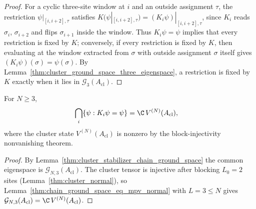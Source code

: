 \begin{proof}
    \leanok
    For a cyclic three-site window at $i$ and an outside assignment $\tau$,
    the restriction $\psi|_{[i,i+2],\tau}$ satisfies
    $K\bigl(\psi|_{[i,i+2],\tau}\bigr) = (K_i\psi)|_{[i,i+2],\tau}$, since
    $K_i$ reads $\sigma_i$, $\sigma_{i+2}$ and flips $\sigma_{i+1}$ inside the
    window. Thus $K_i\psi = \psi$ implies that every restriction is fixed by
    $K$; conversely, if every restriction is fixed by $K$, then evaluating at
    the window extracted from $\sigma$ with outside assignment $\sigma$ itself
    gives $(K_i\psi)(\sigma) = \psi(\sigma)$. By
    Lemma~\ref{thm:cluster_ground_space_three_eigenspace}, a restriction is
    fixed by $K$ exactly when it lies in $\mathcal G_3(A_{\mathrm{cl}})$.
\end{proof}

\begin{lemma}
    \label{thm:cluster_stabilizer_unique_gs}
    \leanok
    For $N\ge3$,
    \begin{align}
        \bigcap_i\{\psi : K_i\psi = \psi\}
         & = \C\,V^{(N)}(A_{\mathrm{cl}}),
        \notag
    \end{align}
    where the cluster state $V^{(N)}(A_{\mathrm{cl}})$ is nonzero by the
    block-injectivity nonvanishing theorem.
\end{lemma}

\begin{proof}
    \leanok
    By Lemma~\ref{thm:cluster_stabilizer_chain_ground_space} the common
    eigenspace is $\mathcal G_{N,3}(A_{\mathrm{cl}})$. The cluster tensor is
    injective after blocking $L_0 = 2$ sites
    (Lemma~\ref{thm:cluster_normal}), so
    Lemma~\ref{thm:chain_ground_space_eq_mpv_normal} with $L = 3 \le N$
    gives $\mathcal G_{N,3}(A_{\mathrm{cl}}) = \C\,V^{(N)}(A_{\mathrm{cl}})$.
\end{proof}

